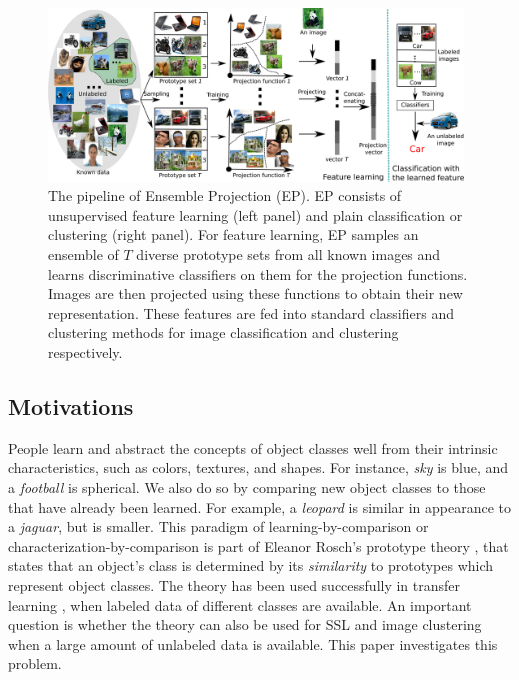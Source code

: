 
\begin{figure}[t]
  \centering
  \includegraphics[width=0.98\textwidth]{./ensemble/pipeline.jpg}
  \caption{The pipeline of Ensemble Projection (EP). EP consists of
    unsupervised feature learning (left panel) and plain
    classification or clustering (right panel). For feature learning,
    EP samples an ensemble of $T$ diverse prototype sets from all
    known images and learns discriminative classifiers on them for the
    projection functions. Images are then projected using these
    functions to obtain their new representation. These features are
    fed into standard classifiers and clustering methods for image
    classification and clustering respectively.}
\label{fig:pipeline}
\end{figure}

\subsection{Motivations}
People learn and abstract the concepts of object classes well from
their intrinsic characteristics, such as colors, textures, and
shapes. For instance, \emph{sky} is blue, and a \emph{football} is
spherical. We also do so by comparing new object classes to those that
have already been learned. For example, a \emph{leopard} is similar in
appearance to a \emph{jaguar}, but is smaller. This paradigm of
learning-by-comparison or characterization-by-comparison is part of
Eleanor Rosch's prototype theory \citep{Rosch:1978}, that states that
an object's class is determined by its \emph{similarity} to prototypes
which represent object classes. The theory has been used successfully
in transfer learning \citep{Transfer:CVPR:08}, when labeled data of
different classes are available. An important question is whether the
theory can also be used for SSL and image clustering when a large
amount of unlabeled data is available. This paper investigates this
problem.

